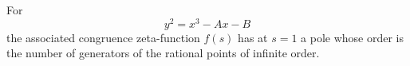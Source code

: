 \begin{conjecture}
    For
\[
    y^2=x^3-Ax-B
\]
    the associated congruence zeta-function $f(s)$ has at $s=1$ a pole whose order is the number of generators of the rational points of infinite order.
\end{conjecture}
